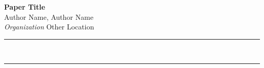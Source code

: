 \documentclass[a4paper,12pt]{article}
\renewenvironment{abstract}
 {\par\noindent\textbf{\abstractname}\ \ignorespaces \\}
 {\par\noindent\medskip}
\begin{document}
\pagestyle{fancy}
\thispagestyle{empty}
\fancyhead[L]{}
\renewcommand*{\thefootnote}{\fnsymbol{footnote}}
\begin{center}
\Large{\textbf{Paper Title}}
\vspace{0.4cm}
\normalsize
\\ Author Name, Author Name \\
\vspace{0.1cm}
\textit{Organization}
\small{Other Location}
\medskip
\normalsize
\end{center}
{\color{gray}\hrule}
\vspace{0.4cm}
\begin{abstract}

\end{abstract}
{\color{gray}\hrule}
\medskip







\end{document}
